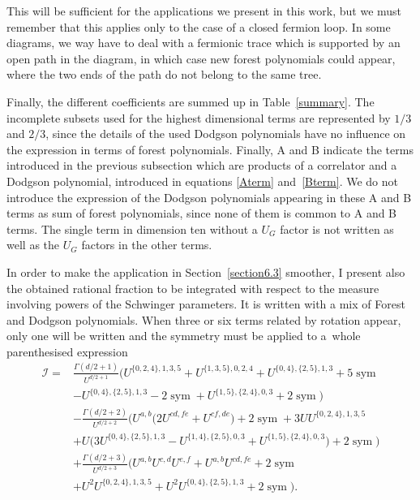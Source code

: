 \documentclass[pdftex]{sigma}
\numberwithin{equation}{section}
\begin{document}
This will be sufficient for the applications we present in this work, but
we must remember that this applies only to the case of a closed fermion loop. In some diagrams, we way have to
deal with a fermionic trace which is supported by an open path in the diagram, in which case new forest
polynomials could appear, where the two ends of the path do not belong to the same tree.

Finally, the different coefficients are summed up in Table~\ref{summary}. The incomplete subsets used for the highest
dimensional terms are represented by $1/3$ and $2/3$, since the details of the used Dodgson polynomials have no
influence on the expression in terms of forest polynomials. Finally, A and B indicate the terms introduced in the previous
subsection which are products of a correlator and a Dodgson polynomial, introduced in equations \eqref{Aterm} and~\eqref{Bterm}.
We do not introduce the expression of the Dodgson polynomials appearing in these A and B terms as sum of forest polynomials, since none of them is
common to A and B terms. The single term in dimension
ten without a $U_G$ factor is not written as well as the $U_G$ factors in the other terms.

In order to make the application in Section~\ref{section6.3} smoother, I present also the obtained rational fraction to be integrated with respect to the
measure involving powers of the Schwinger parameters. It is written with a mix of Forest and Dodgson
polynomials. When three or six terms related by rotation appear, only one will be written and the symmetry must be applied to a~whole parenthesised
expression
\begin{align*}
{\mathcal I} ={}& \frac{\Gamma(d/2+1)}{U^{d/2+1}} \bigl( U^{\{0,2,4\},1,3,5} + U^{\{1,3,5\},0,2,4} + U^{\{0,4\},\{2,5\},1,3} + 5 \operatorname{sym} \nonumber \\
& - U^{\{0,4\},\{2,5\},1,3} - 2 \operatorname{sym} + U^{\{1,5\},\{2,4\},0,3} + 2 \operatorname{sym} \bigr) \nonumber\\
&-\frac{\Gamma(d/2+2)}{U^{d/2+2}} \bigl( U^{a,b} \bigl( 2 U^{cd,fe} + U^{cf,de} \bigr) + 2 \operatorname{sym}+ 3 U U^{\{0,2,4\},1,3,5} \nonumber \\
	&+ U \bigl(3 U^{\{0,4\},\{2,5\},1,3} - U^{\{1,4\},\{2,5\},0,3} + U^{\{1,5\},\{2,4\},0,3}\bigr) + 2 \operatorname{sym} \bigr) \nonumber \\
&+ \frac{\Gamma(d/2+3)}{U^{d/2+3}} \bigl( U^{a,b} U^{c,d} U^{e,f} + U^{a,b} U^{cd,fe} + 2 \operatorname{sym} \nonumber\\
& + U^2 U^{\{0,2,4\},1,3,5} + U^2 U^{\{0,4\},\{2,5\},1,3} + 2 \operatorname{sym} \bigr).
\end{align*}
\end{document}
